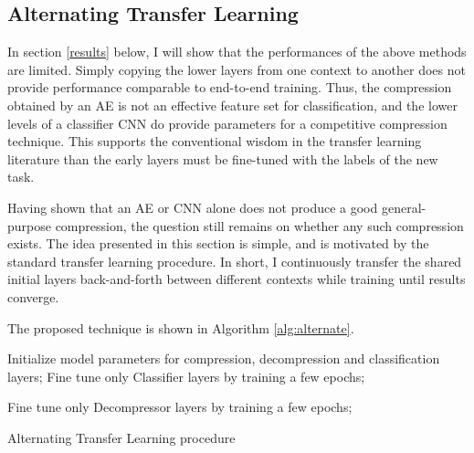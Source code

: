 \documentclass[twoside,11pt]{article}
\begin{document}
\subsection{Alternating Transfer Learning} \label{alternate}

In section \ref{results} below, I will show that the performances of the above methods are limited. 
Simply copying the lower layers from one context to another 
does not provide performance comparable to end-to-end training. 
Thus, the compression obtained by an AE
is not an effective feature set for classification, and the lower levels of a classifier 
CNN do provide parameters for a competitive compression technique. This supports the conventional wisdom 
in the transfer learning literature than the early layers must be fine-tuned with the
labels of the new task.

Having shown that an AE or CNN alone does not produce a good general-purpose compression,
the question still remains on whether any such compression exists. 
The idea presented in this section is simple, and is motivated by 
the standard transfer learning procedure. In short, I continuously transfer the shared
initial layers back-and-forth between different contexts while training until results converge. 

The proposed technique is shown in Algorithm \ref{alg:alternate}.

\begin{algorithm}[H]
\SetAlgoLined
{}
 Initialize model parameters for compression, decompression and classification layers;
 Fine tune only Classifier layers by training a few epochs;

 Fine tune only Decompressor layers by training a few epochs;
 \caption{Alternating Transfer Learning procedure}
 \label{alg:alternate}
\end{algorithm}
\end{document}
